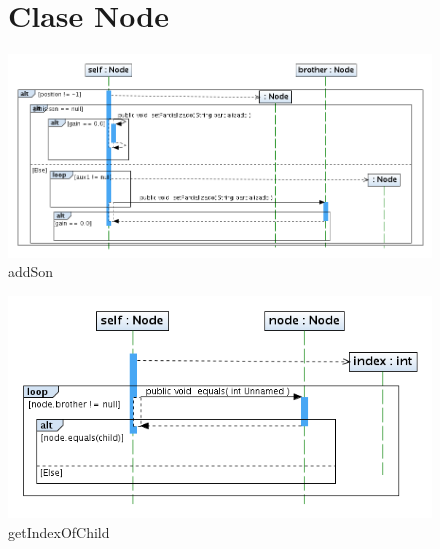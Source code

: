\documentclass[letterpaper,12pt]{report}
\begin{document}
\begin{figure}
\section{Clase Node}
\centering
\includegraphics[width=1.2\textwidth]{Node/addSon.png}
\caption{addSon}
\end{figure}
\newpage
\begin{figure}
\centering
\includegraphics[width=1\textwidth]{Node/getIndexOfChild.png}
\caption{getIndexOfChild}
\end{figure}
\newpage
\end{document}
